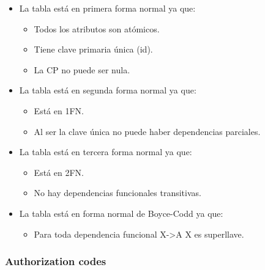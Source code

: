 \documentclass[12pt,a4paperpaper,]{report}
\providecommand{\tightlist}{%
  \setlength{\itemsep}{0pt}\setlength{\parskip}{0pt}}
\begin{document}
\begin{itemize}
\tightlist
\item
  La tabla está en primera forma normal ya que:

  \begin{itemize}
  \tightlist
  \item
    Todos los atributos son atómicos.
  \item
    Tiene clave primaria única (id).
  \item
    La CP no puede ser nula.
  \end{itemize}
\item
  La tabla está en segunda forma normal ya que:

  \begin{itemize}
  \tightlist
  \item
    Está en 1FN.
  \item
    Al ser la clave única no puede haber dependencias parciales.
  \end{itemize}
\item
  La tabla está en tercera forma normal ya que:

  \begin{itemize}
  \tightlist
  \item
    Está en 2FN.
  \item
    No hay dependencias funcionales transitivas.
  \end{itemize}
\item
  La tabla está en forma normal de Boyce-Codd ya que:

  \begin{itemize}
  \tightlist
  \item
    Para toda dependencia funcional X-\textgreater{}A X es superllave.
  \end{itemize}
\end{itemize}

\subsubsection{Authorization codes}\label{authorization-codes}
\end{document}
